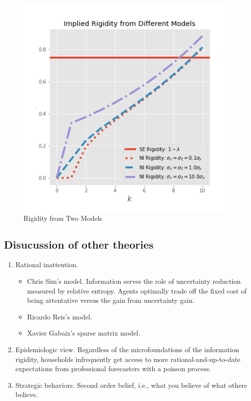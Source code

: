 \documentclass[]{article}
\begin{document}
\begin{figure}[ht]
	\centering
	\includegraphics[width=13cm]{figures/rigidity.png} 
	\caption{Rigidity from Two Models}
	\label{rigidity}
\end{figure}


\subsection{Disucussion of other theories}

\begin{enumerate}
\item Rational inattention. 
\begin{itemize}
	\item Chris Sim's model.\citet{sims2003implications} Information serves the role of uncertainty reduction measured by relative entropy. Agents optimally trade off the fixed cost of being attentative versus the gain from uncertainty gain.   
	\item Ricardo Reis's model. \citet{reis2006inattentive}
	\item Xavier Gabaix's sparse matrix model. \citet{gabaix2014sparsity}
\end{itemize}

\item Epidemiologic view. \citet{carroll2003macroeconomic} Regardless of the microfoundations of the information rigidity, households infrequently get access to more rational-and-up-to-date expectations from professional forecasters with a poisson process. 


\item Strategic behaviors. Second order belief, i.e., what you believe of what others believe. \citet{angeletos2009incomplete}



\end{enumerate}
\end{document}
